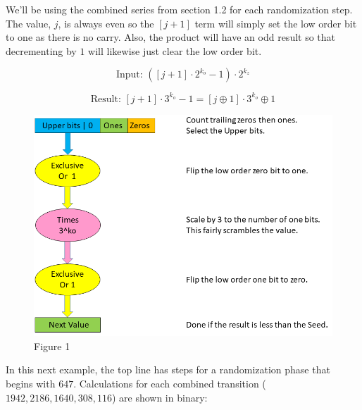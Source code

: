\documentclass[preprint]{sigplanconf}
\begin{document}
We'll be using the combined series from section 1.2 for each randomization step. The value, $j$, is always even so the $[j + 1]$ term will simply set the low order bit to one as there is no carry. Also, the product will have an odd result so that decrementing by $1$ will likewise just clear the low order bit.

\[
    \text{Input: } ([j + 1] \cdot 2^{k_o} - 1) \cdot 2^{k_z}
\]

\[
    \text{Result: } [j + 1] \cdot 3^{k_o} - 1 = [j \oplus 1] \cdot 3^{k_o} \oplus 1
\]



\begin{figure}
    \begin{center}
        \includegraphics[width=\columnwidth]{collatz_even}
    \end{center}
    \caption{Figure 1}
    \label{fig-1}
\end{figure}

\newpage

In this next example, the top line has steps for a randomization phase that begins with $647$. Calculations for each combined transition ($1942, 2186, 1640, 308, 116$) are shown in binary:
\end{document}
